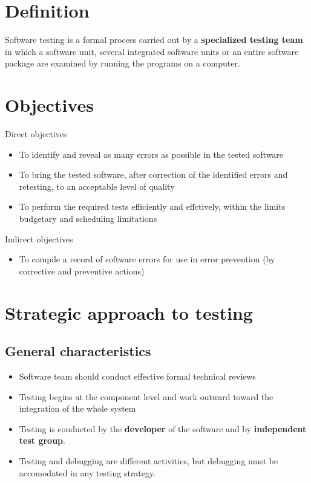 \documentclass{article}
\begin{document}
\tableofcontents

\newpage

\section{Definition}

\begin{flushleft}
Software testing is a formal process carried out by a \textbf{specialized testing team} in which a software unit, several integrated software units or an entire software package are examined by running the programs on a computer.
\end{flushleft}

\section{Objectives}

\begin{flushleft}
Direct objectives
\begin{itemize}
  \item To identify and reveal as many errors as possible in the tested software
  \item To bring the tested software, after correction of the identified errors and retesting, to an acceptable level of quality
  \item To perform the required tests efficiently and effctively, within the limits budgetary and scheduling limitations
\end{itemize}
Indirect objectives
\begin{itemize}
  \item To compile a record of software errors for use in error prevention (by corrective and preventive actions)
\end{itemize}
\end{flushleft}

\section{Strategic approach to testing}

\subsection{General characteristics}
\begin{itemize}
  \item Software team should conduct effective formal technical reviews
  \item Testing begins at the component level and work outward toward the integration of the whole system
  \item Testing is conducted by the \textbf{developer} of the software and by \textbf{independent test group}.
  \item Testing and debugging are different activities, but debugging must be accomodated in any testing strategy.
\end{itemize}
\end{document}

